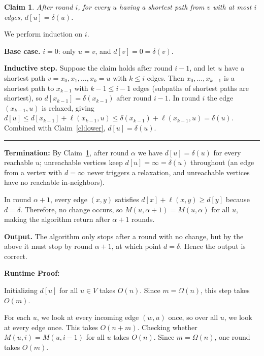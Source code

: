 \documentclass[11pt]{article}
\newenvironment{proof}{{\bf Proof:  }}{\hfill\rule{2mm}{2mm}}
\newtheorem{claim}[fact]{Claim}
\begin{document}
\begin{claim}\label{cl:rounds}
After round $i$, for every $u$ having a shortest path from $v$ with at most $i$ edges, $d[u] = \delta(u)$.
\end{claim}

\begin{proof}
We perform induction on $i$. 

\textbf{Base case.} 
$i = 0$: only $u = v$, and $d[v] = 0 = \delta(v)$.

\textbf{Inductive step.} 
Suppose the claim holds after round $i-1$, and let $u$ have a shortest path $v = x_0, x_1, \dots, x_k = u$ with $k \le i$ edges. 
Then $x_0, \dots, x_{k-1}$ is a shortest path to $x_{k-1}$ with $k-1 \le i-1$ edges (subpaths of shortest paths are shortest), 
so $d[x_{k-1}] = \delta(x_{k-1})$ after round $i-1$. In round $i$ the edge $(x_{k-1}, u)$ is relaxed, giving 
$d[u] \le d[x_{k-1}] + \ell(x_{k-1},u) \le \delta(x_{k-1}) + \ell(x_{k-1},u) = \delta(u)$. Combined with Claim~\ref{cl:lower}, $d[u] = \delta(u)$.
\end{proof}

\medskip

\textbf{Termination:} 
By Claim~\ref{cl:rounds}, after round $\alpha$ we have $d[u] = \delta(u)$ for every reachable $u$; unreachable vertices keep $d[u] = \infty = \delta(u)$ 
throughout (an edge from a vertex with $d = \infty$ never triggers a relaxation, and unreachable vertices have no reachable in-neighbors).

In round $\alpha + 1$, every edge $(x, y)$ satisfies $d[x] + \ell(x,y) \ge d[y]$ because $d = \delta$. 
Therefore, no change occurs, so $M(u, \alpha + 1) = M(u, \alpha)$ for all $u$, making the algorithm return after $\alpha + 1$ rounds.

\medskip

\textbf{Output.} The algorithm only stops after a round with no change, but by the above it must stop by round $\alpha + 1$, 
at which point $d = \delta$. Hence the output is correct. 

\bigbreak

\textbf{Runtime Proof:}

Initializing $d[u]$ for all $u \in V$ takes $O(n)$. Since $m = \Omega(n)$, this step takes $O(m)$.

For each $u$, we look at every incoming edge $(w, u)$ once, so over all $u$, we look at every edge once. This takes $O(n + m)$. 
Checking whether $M(u, i) = M(u, i-1)$ for all $u$ takes $O(n)$.
Since $m = \Omega(n)$, one round takes $O(m)$.
\end{document}
